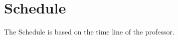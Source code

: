 
\chapter{Schedule}
\label{loc:Schedule}

The Schedule is based on the time line of the professor.

